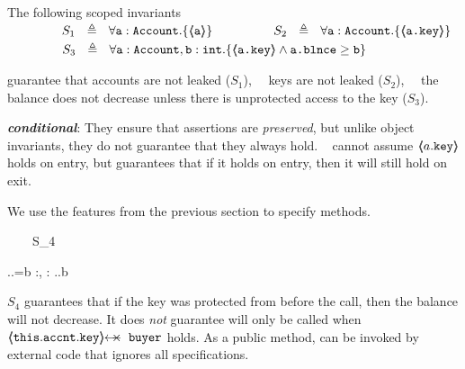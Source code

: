 \begin{example}
\label{s:bankSpecEx}
The following scoped invariants\\
$\strut \SPSP\ \ \   S_1\ \  \triangleq \ \ \TwoStatesN {\prg{a}:\prg{Account}}  {\inside{\prg{a}}} $ 
\hspace{1.1cm}
$\strut  \SPSP\ \ \   S_2\ \  \triangleq \ \ \TwoStatesN  {\prg{a}:\prg{Account}}  {\inside{\prg{a.key}}} $ 
\\
$\strut  \SPSP\ \ \   S_3\ \  \triangleq \ \ \TwoStatesN{ \prg{a}:\prg{Account},\prg{b}:\prg{int} } {\inside{\prg{a.key}} \wedge \prg{a.\balance} \geq \prg{b} } $ 

\noindent
 guarantee that   accounts are not leaked  ($S_1$), \ \ keys are not leaked  ($S_2$), \ \ the balance does not decrease unless there is unprotected access to the key  ($S_3$).
%
\end{example} 


 
 \vspace{.05cm}

 
\noindent
{\textbf{ \emph{conditional}}:}  They ensure that assertions are \emph{preserved}, but unlike object invariants, they do not guarantee that they always hold.
\ \Eg   {} cannot assume $\langle\!\!\langle a.\mbox{\normalfont{\texttt{key}}} \rangle\!\!\rangle$ holds on entry, but   guarantees that if it holds on entry, then  it will still hold on exit.

 
 \begin{example}
 We   use the features from the previous section to specify methods. 

{\sprepost
		{\strut \ \ \ \ S_4} 
		{    {} \wedge {}.\prg{\myAccount}.\prg{\balance}=b
		 }
		{} {} {:, : }
		{ 
		  .\prg{\myAccount}.\prg{\balance}\geq b
		 }
}

\noindent
$S_4$  guarantees that if the %
key was protected from  before the call, then the balance will not decrease. %
 It does \emph{not} guarantee  will only be called when $\protectedFrom{\prg{this}.\prg{\myAccount}.\prg{key}} {\prg{buyer}}$ holds. 
As a  public method,    can be invoked by external code that ignores all specifications.
\end{example}

